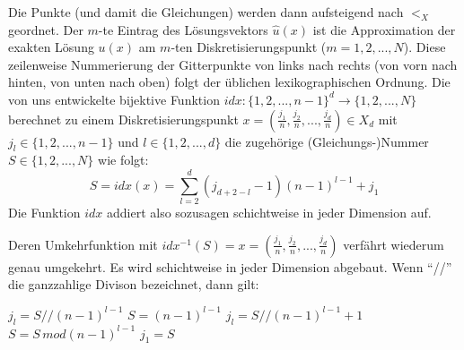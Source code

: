 \documentclass{scrartcl}
\begin{document}
Die Punkte (und damit die Gleichungen) werden dann aufsteigend nach $<_X$ geordnet. Der $m$-te Eintrag des Lösungsvektors $\hat{u}(x)$ ist die Approximation der exakten Lösung $u(x)$ am $m$-ten Diskretisierungspunkt ($m = 1, 2, ..., N$). Diese zeilenweise Nummerierung der Gitterpunkte von links nach rechts (von vorn nach hinten, von unten nach oben) folgt der üblichen lexikographischen Ordnung.
Die von uns entwickelte bijektive Funktion $idx: \lbrace1, 2, ..., n-1\rbrace^d \to \lbrace1, 2, ..., N\rbrace$ berechnet zu einem Diskretisierungspunkt
$x = (\frac{j_1}{n}, \frac{j_2}{n}, ..., \frac{j_d}{n}) \in X_d$ mit $j_l \in \lbrace1, 2, ..., n-1\rbrace$ und $l \in \lbrace1, 2, ..., d\rbrace$ die zugehörige (Gleichungs-)Nummer $S \in \lbrace1, 2, ..., N\rbrace$ wie folgt:
\[S=idx(x) = \sum_{l=2}^{d} (j_{d+2-l}-1)(n-1)^{l-1}+j_1 \]
Die Funktion $idx$ addiert also sozusagen schichtweise in jeder Dimension auf.

Deren Umkehrfunktion mit $idx^{-1}(S) = x = (\frac{j_1}{n}, \frac{j_2}{n}, ..., \frac{j_d}{n})$ verfährt wiederum genau umgekehrt. Es wird schichtweise in jeder Dimension abgebaut. Wenn "`//"' die ganzzahlige Divison bezeichnet, dann gilt:

\begin{shaded}
  \begin{algorithmic}
        \State $j_l=S//(n-1)^{l-1}$
        \State $S = (n-1)^{l-1}$
      \Else
        \State $j_l=S//(n-1)^{l-1} + 1$
        \State $S = S \, mod(n-1)^{l-1}$
      \EndIf
    \EndFor
    \State $j_1 = S$
  \end{algorithmic}
\end{shaded}
\end{document}
